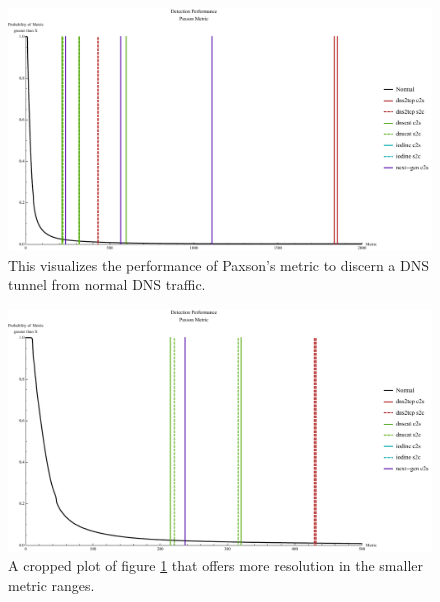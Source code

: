 \documentclass[12pt]{report}
\theoremstyle{remark}
\theoremstyle{definition}
\theoremstyle{definition}
\theoremstyle{definition}
\begin{document}
\begin{figure}
\centering
\includegraphics[width=\textwidth]{figures/mppv.pdf}
\caption[Detection Thresholds Under Paxson's Metric]{This visualizes the performance of Paxson's metric to discern a DNS tunnel from normal DNS traffic.}
\label{mppv}
\end{figure}
\begin{figure}
\centering
\includegraphics[width=\textwidth]{figures/mppv-500.pdf}
\caption[Detection Thresholds Under Paxson's Metric - Truncated View]{A cropped plot of figure \ref{mppv} that offers more resolution in the smaller metric ranges.}
\label{mppv-500}
\end{figure}
\end{document}
